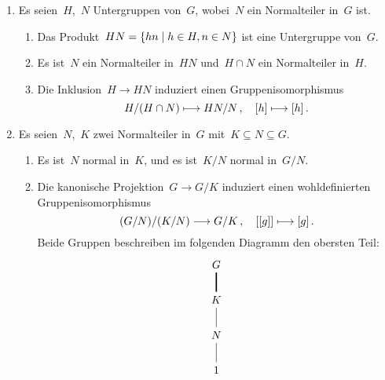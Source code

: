 \begin{corollary}
  \leavevmode
  \begin{enumerate}
    \item
      Es seien~$H$,~$N$ Untergruppen von~$G$, wobei~$N$ ein Normalteiler in~$G$ ist.
      \begin{enumerate}
        \item
          Das Produkt~$HN = \{ hn \suchthat h \in H, n \in N \}$ ist eine Untergruppe von~$G$.
        \item
          Es ist~$N$ ein Normalteiler in~$HN$ und~$H \cap N$ ein Normalteiler in~$H$.
        \item
          Die Inklusion~$H \to HN$ induziert einen Gruppenisomorphismus
          \[
            H / (H \cap N)
            \mapsto
            HN / N \,,
            \quad
            \class{h}
            \mapsto
            \class{h} \,.
          \]
      \end{enumerate}
    \item
      Es seien~$N$,~$K$ zwei Normalteiler in~$G$ mit~$K \subseteq N \subseteq G$.
      \begin{enumerate}
        \item
          Es ist~$N$ normal in~$K$, und es ist~$K/N$ normal in~$G/N$.
        \item
          Die kanonische Projektion~$G \to G/K$ induziert einen wohldefinierten Gruppenisomorphismus
          \[
            (G/N) / (K/N)
            \to
            G / K \,,
            \quad
            \class{ \class{g} }
            \mapsto
            \class{g} \,.
          \]
          Beide Gruppen beschreiben im folgenden Diagramm den obersten Teil:
          \[
            \begin{tikzcd}
              G
              \\
              K
              \arrow[very thick, dash]{u}
              \\
              N
              \arrow[dash]{u}
              \\
              1
              \arrow[dash]{u}
            \end{tikzcd}
          \]
      \end{enumerate}
  \end{enumerate}
\end{corollary}





